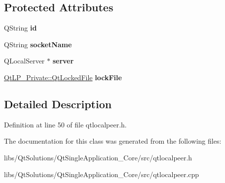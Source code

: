 \subsection*{Protected Attributes}
\begin{DoxyCompactItemize}
\item 
Q\+String {\bfseries id}\hypertarget{class_qt_local_peer_a89ee3139c0e2515e081a2b5de98beda6}{}\label{class_qt_local_peer_a89ee3139c0e2515e081a2b5de98beda6}

\item 
Q\+String {\bfseries socket\+Name}\hypertarget{class_qt_local_peer_a2c86a18c237bdfe4bd0565d3cc413cd8}{}\label{class_qt_local_peer_a2c86a18c237bdfe4bd0565d3cc413cd8}

\item 
Q\+Local\+Server $\ast$ {\bfseries server}\hypertarget{class_qt_local_peer_af400ab8eb001ef4790541069a5d0e292}{}\label{class_qt_local_peer_af400ab8eb001ef4790541069a5d0e292}

\item 
\hyperlink{class_qt_l_p___private_1_1_qt_locked_file}{Qt\+L\+P\+\_\+\+Private\+::\+Qt\+Locked\+File} {\bfseries lock\+File}\hypertarget{class_qt_local_peer_ae41ee5934f4e862f0817217ade062e10}{}\label{class_qt_local_peer_ae41ee5934f4e862f0817217ade062e10}

\end{DoxyCompactItemize}


\subsection{Detailed Description}


Definition at line 50 of file qtlocalpeer.\+h.



The documentation for this class was generated from the following files\+:\begin{DoxyCompactItemize}
\item 
libs/\+Qt\+Solutions/\+Qt\+Single\+Application\+\_\+\+Core/src/qtlocalpeer.\+h\item 
libs/\+Qt\+Solutions/\+Qt\+Single\+Application\+\_\+\+Core/src/qtlocalpeer.\+cpp\end{DoxyCompactItemize}
